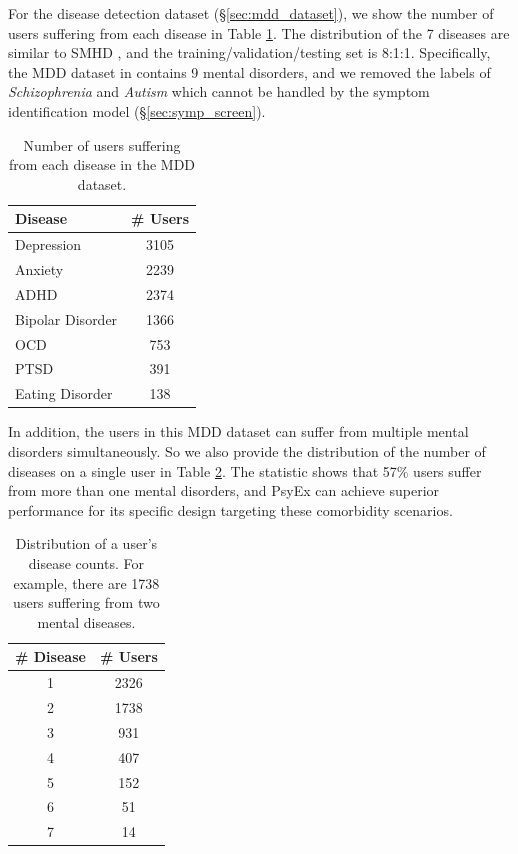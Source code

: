 For the disease detection dataset (\S \ref{sec:mdd_dataset}), we show the number of users suffering from each disease in Table \ref{tab:disease_detect_count}. The distribution of the 7 diseases are similar to SMHD \citep{cohan2018smhd}, and the  training/validation/testing set is 8:1:1. Specifically, the MDD dataset in \citet{Zhang2022SymptomIF} contains 9 mental disorders, and we removed the labels of \textit{Schizophrenia} and \textit{Autism} which cannot be handled by the symptom identification model (\S \ref{sec:symp_screen}).
\begin{table}[h]
    \small
    \centering
    \begin{tabular}{lc}
    \hline
    Disease          & \# Users \\
    \hline
    Depression       & 3105         \\
    Anxiety          & 2239         \\
    ADHD             & 2374         \\
    Bipolar Disorder & 1366         \\
    OCD              & 753          \\
    PTSD             & 391          \\
    Eating Disorder  & 138          \\
    \hline
    \end{tabular}
    \caption{Number of users suffering from each disease in the MDD dataset.}
    \label{tab:disease_detect_count}
\end{table}

In addition, the users in this MDD dataset can suffer from multiple mental disorders simultaneously. So we also provide the distribution of the number of diseases on a single user in Table \ref{tab:dis_num_distribution}. The statistic shows that 57\% users suffer from more than one mental disorders, and PsyEx can achieve superior performance for its specific design targeting these comorbidity scenarios.
\begin{table}[h]
    \small
    \centering
    \begin{tabular}{cc}
    \hline
    \# Disease          & \# Users \\
    \hline
    1   & 2326         \\
    2   & 1738         \\
    3   & 931         \\
    4   & 407         \\
    5   & 152          \\
    6   & 51          \\
    7   & 14    \\
    \hline
    \end{tabular}
    \caption{Distribution of a user's disease counts. For example, there are 1738 users suffering from two mental diseases.}
    \label{tab:dis_num_distribution}
\end{table}

